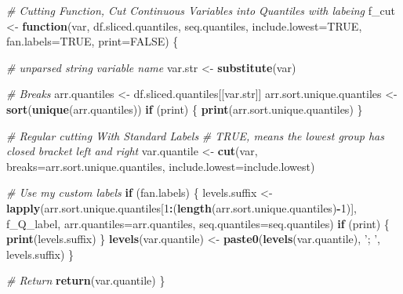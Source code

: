 \documentclass[
]{book}
\newenvironment{Shaded}{\begin{snugshade}}{\end{snugshade}}
\newcommand{\CommentTok}[1]{\textcolor[rgb]{0.56,0.35,0.01}{\textit{#1}}}
\newcommand{\ControlFlowTok}[1]{\textcolor[rgb]{0.13,0.29,0.53}{\textbf{#1}}}
\newcommand{\DataTypeTok}[1]{\textcolor[rgb]{0.13,0.29,0.53}{#1}}
\newcommand{\DecValTok}[1]{\textcolor[rgb]{0.00,0.00,0.81}{#1}}
\newcommand{\KeywordTok}[1]{\textcolor[rgb]{0.13,0.29,0.53}{\textbf{#1}}}
\newcommand{\NormalTok}[1]{#1}
\newcommand{\OperatorTok}[1]{\textcolor[rgb]{0.81,0.36,0.00}{\textbf{#1}}}
\newcommand{\OtherTok}[1]{\textcolor[rgb]{0.56,0.35,0.01}{#1}}
\newcommand{\StringTok}[1]{\textcolor[rgb]{0.31,0.60,0.02}{#1}}
\begin{document}
\begin{Shaded}
\begin{Highlighting}[]
\CommentTok{# Cutting Function, Cut Continuous Variables into Quantiles with labeing}
\NormalTok{f_cut <-}\StringTok{ }\ControlFlowTok{function}\NormalTok{(var, df.sliced.quantiles, seq.quantiles, }\DataTypeTok{include.lowest=}\OtherTok{TRUE}\NormalTok{, }\DataTypeTok{fan.labels=}\OtherTok{TRUE}\NormalTok{, }\DataTypeTok{print=}\OtherTok{FALSE}\NormalTok{) \{}

    \CommentTok{# unparsed string variable name}
\NormalTok{    var.str <-}\StringTok{ }\KeywordTok{substitute}\NormalTok{(var)}

    \CommentTok{# Breaks}
\NormalTok{    arr.quantiles <-}\StringTok{ }\NormalTok{df.sliced.quantiles[[var.str]]}
\NormalTok{    arr.sort.unique.quantiles <-}\StringTok{ }\KeywordTok{sort}\NormalTok{(}\KeywordTok{unique}\NormalTok{(arr.quantiles))}
    \ControlFlowTok{if}\NormalTok{ (print) \{}
        \KeywordTok{print}\NormalTok{(arr.sort.unique.quantiles)}
\NormalTok{    \}}

    \CommentTok{# Regular cutting With Standard Labels}
    \CommentTok{# TRUE, means the lowest group has closed bracket left and right}
\NormalTok{    var.quantile <-}\StringTok{ }\KeywordTok{cut}\NormalTok{(var, }\DataTypeTok{breaks=}\NormalTok{arr.sort.unique.quantiles, }\DataTypeTok{include.lowest=}\NormalTok{include.lowest)}

    \CommentTok{# Use my custom labels}
    \ControlFlowTok{if}\NormalTok{ (fan.labels) \{}
\NormalTok{        levels.suffix <-}\StringTok{ }\KeywordTok{lapply}\NormalTok{(arr.sort.unique.quantiles[}\DecValTok{1}\OperatorTok{:}\NormalTok{(}\KeywordTok{length}\NormalTok{(arr.sort.unique.quantiles)}\OperatorTok{-}\DecValTok{1}\NormalTok{)],}
\NormalTok{                                f_Q_label,}
                                \DataTypeTok{arr.quantiles=}\NormalTok{arr.quantiles,}
                                \DataTypeTok{seq.quantiles=}\NormalTok{seq.quantiles)}
        \ControlFlowTok{if}\NormalTok{ (print) \{}
            \KeywordTok{print}\NormalTok{(levels.suffix)}
\NormalTok{        \}}
        \KeywordTok{levels}\NormalTok{(var.quantile) <-}\StringTok{ }\KeywordTok{paste0}\NormalTok{(}\KeywordTok{levels}\NormalTok{(var.quantile), }\StringTok{'; '}\NormalTok{, levels.suffix)}
\NormalTok{    \}}

    \CommentTok{# Return}
    \KeywordTok{return}\NormalTok{(var.quantile)}
\NormalTok{\}}
\end{Highlighting}
\end{Shaded}
\end{document}

